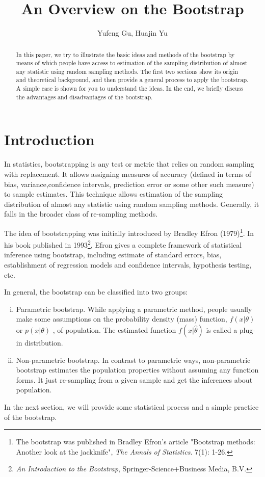\documentclass{journal}
\title{An Overview on the Bootstrap}
\author{Yufeng Gu, Huajin Yu}
\begin{document}
\maketitle

\begin{abstract}
In this paper, we try to illustrate the basic ideas and methods of the bootstrap by means of which people have access to estimation of the sampling distribution of almost any statistic using random sampling methods. The first two sections show its origin and theoretical background, and then provide a general process to apply the bootstrap. A simple case is shown for you to understand the ideas. In the end, we briefly discuss the advantages and disadvantages of the bootstrap.
\end{abstract}

\section{Introduction}
\par In statistics, bootstrapping is any test or metric that relies on random sampling with replacement. It allows assigning measures of accuracy (defined in terms of bias, variance,confidence intervals, prediction error or some other such measure) to sample estimates. This technique allows estimation of the sampling distribution of almost any statistic using random sampling methods. Generally, it falls in the broader class of re-sampling methods.
\par The idea of bootstrapping was initially introduced by Bradley Efron (1979)\footnote{The bootstrap was published in Bradley Efron's article "Bootstrap methods: Another look at the jackknife", \textit{The Annals of Statistics}. 7(1): 1-26.}. In his book published in 1993\footnote{\textit{An Introduction to the Bootstrap}, Springer-Science+Business Media, B.V.}, Efron gives a complete framework of statistical inference using bootstrap, including estimate of standard errors, bias, establishment of regression models and confidence intervals, hypothesis testing, etc.
\par In general, the bootstrap can be classified into two groups:
\begin{enumerate} [i.]
\item Parametric bootstrap. While applying a parametric method, people usually make some assumptions on the probability density (mass) function, $ f(x\vert\theta) $ or $ p(x\vert\theta) $ , of population. The estimated function $ f(x\vert\hat{\theta}) $ is called a plug-in distribution.
\item Non-parametric bootstrap. In contrast to parametric ways, non-parametric bootstrap estimates the population properties without assuming any function forms. It just re-sampling from a given sample and get the inferences about population.
\end{enumerate} 
\par In the next section, we will provide some statistical process and a simple practice of the bootstrap.
\end{document}
